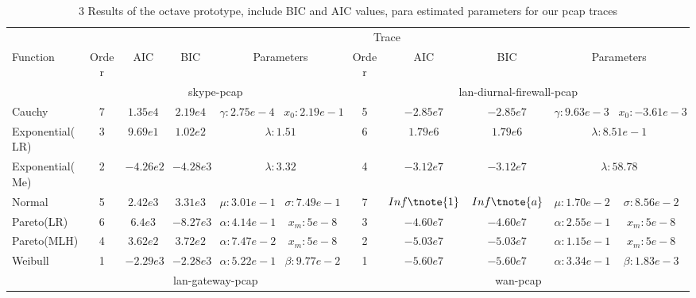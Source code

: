 \begin{table}
	\centering
    \caption{3 Results of the octave prototype, include BIC and AIC values, para estimated parameters for our pcap traces}
        \begin{threeparttable}[t]
        \begin{tabular}{lcccccccccc}
            \hline
            & \multicolumn{10}{c}{Trace} \\ \cline{2-11} 
            Function        & Order & AIC  & BIC  & \multicolumn{2}{c}{Parameters}  
            & Order & AIC & BIC  & \multicolumn{2}{c}{Parameters} \\ \hline 
            
            & \multicolumn{5}{c}{skype-pcap}  & \multicolumn{5}{c}{lan-diurnal-firewall-pcap}   \\ \hline 
            Cauchy          &    7 & $1.35e4$    & $2.19e4$    & $\gamma:2.75e-4$ & $x_0:2.19e-1$    
            &    5 & $-2.85e7$   & $-2.85e7$   & $\gamma:9.63e-3$ & $x_0:-3.61e-3$    \\
            Exponential(LR) &    3 & $9.69e1$   & $1.02e2$   & \multicolumn{2}{c}{$\lambda:1.51$}   
            &    6 & $1.79e6$    & $1.79e6$    & \multicolumn{2}{c}{$\lambda:8.51e-1$}    \\
            Exponential(Me) &    2 & $-4.26e2$   & $-4.28e3$   & \multicolumn{2}{c}{$\lambda:3.32$}   
            &    4 & $-3.12e7$   & $-3.12e7$   & \multicolumn{2}{c}{$ \lambda:58.78$} \\
            Normal          &    5 & $2.42e3$    & $3.31e3$    & $\mu:3.01e-1 $    & $\sigma:7.49e-1$ 
            &    7 & $Inf \tnote{1}$       & $Inf \tnote{a}$       & $\mu:1.70e-2$     & $\sigma:8.56e-2$ \\
            Pareto(LR)      &    6 & $6.4e3$   & $-8.27e3$   & $\alpha:4.14e-1$ & $x_m:5e-8$    
            &    3 & $-4.60e7$   & $-4.60e7$   & $\alpha:2.55e-1$ & $ x_m:5e-8$    \\
            Pareto(MLH)     &    4 & $3.62e2$   & $3.72e2$   & $\alpha:7.47e-2$ & $x_m:5e-8$    
            &    2 & $-5.03e7$   & $-5.03e7$   & $\alpha:1.15e-1$ & $ x_m:5e-8$    \\
            Weibull         &    1 & $-2.29e3$   & $-2.28e3$  & $\alpha:5.22e-1$ & $\beta:9.77e-2$  
            &    1 & $-5.60e7$   & $-5.60e7$   & $\alpha:3.34e-1$ & $\beta:1.83e-3$  \\ \hline    
            & \multicolumn{5}{c}{lan-gateway-pcap} & \multicolumn{5}{c}{wan-pcap}  \\ \hline

\end{tabular}
\end{threeparttable}
\end{table}
